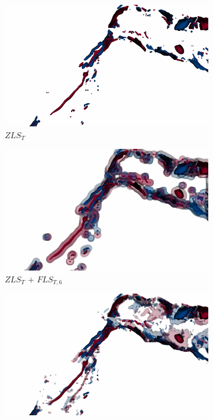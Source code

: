 \begin{figure}[!h]
\begin{subfigure}{0.24\linewidth}
\centering
\includegraphics[width=\linewidth]{Images/RedSeaEddy/zls.pdf}
\vspace{-2mm}
\caption{$ZLS_{T}$}
\label{fig:rse_zls}
\end{subfigure}
\begin{subfigure}{0.24\linewidth}
\centering
\includegraphics[width=\linewidth]{Images/RedSeaEddy/fls_6.pdf}
\vspace{-2mm}
\caption{$ZLS_{T}$ + $FLS_{T,6}$}
\label{fig:rse_fls}
\end{subfigure}
\begin{subfigure}{0.24\linewidth}
\centering
\includegraphics[width=\linewidth]{Images/RedSeaEddy/fcls_68.pdf}

\end{subfigure}
\end{figure}
